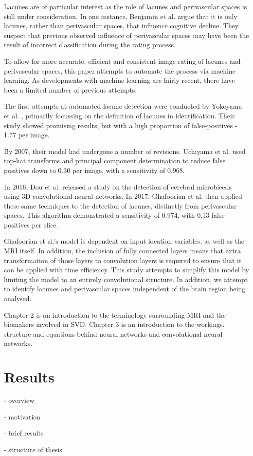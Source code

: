 Lacunes are of particular interest as the role of lacunes and perivascular spaces is still under consideration. In one instance, Benjamin et al. \cite{BenjaminJ.Philip2018LIbN} argue that it is only lacunes, rather than perivascular spaces, that influence cognitive decline. They suspect that previous observed influence of perivascular spaces may have been the result of incorrect classification during the rating process.

To allow for more accurate, efficient and consistent image rating of lacunes and perivascular spaces, this paper attempts to automate the process via machine learning. As developments with machine learning are fairly recent, there have been a limited number of previous attempts.

The first attempts at automated lacune detection were conducted by Yokoyama et al. \cite{YokoyamaRyujiro2002Aado}, primarily focussing on the definition of lacunes in identification. Their study showed promising results, but with a high proportion of false-positives - 1.77 per image.

By 2007, their model had undergone a number of revisions. Uchiyama et al. \cite{UchiyamaYoshikazu2007Ioad} used top-hat transforms and principal component determination to reduce false positives down to 0.30 per image, with a sensitivity of 0.968.

In 2016, Dou et al. \cite{DouQ.2016ADoC} released a study on the detection of cerebral microbleeds using 3D convolutional neural networks. In 2017, Ghafoorian et al. \cite{GhafoorianM.2017Dml3} then applied these same techniques to the detection of lacunes, distinctly from perivascular spaces. This algorithm demonstrated a sensitivity of 0.974, with 0.13 false positives per slice.

Ghafoorian et al.'s model is dependent on input location variables, as well as the MRI itself. In addition, the inclusion of fully connected layers means that extra transformation of those layers to convolution layers is required to ensure that it can be applied with time efficiency. This study attempts to simplify this model by limiting the model to an entirely convolutional structure. In addition, we attempt to identify lacunes and perivascular spaces independent of the brain region being analysed.

Chapter 2 is an introduction to the terminology surrounding MRI and the biomakers involved in SVD. Chapter 3 is an introduction to the workings, structure and equations behind neural networks and convolutional neural networks.

\section{Results}\label{intro-results}


- overview

- motivation

- brief results

- structure of thesis





%